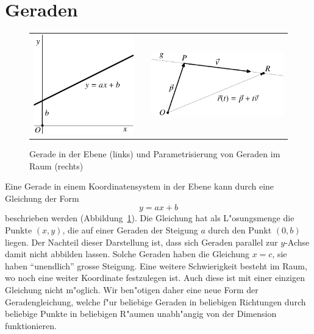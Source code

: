 \section{Geraden}
\begin{figure}
\begin{center}
\begin{tabular}{ccc}
\includegraphics{images/v-6}&%
\qquad\qquad\qquad&
\includegraphics{images/v-7}%
\end{tabular}
\end{center}
\caption{Gerade in der Ebene (links) und Parametrisierung von Geraden im
Raum (rechts) \label{image-gerade}}
\end{figure}
Eine Gerade in einem Koordinatensystem in der Ebene kann durch eine
Gleichung der Form
\[
y=ax+b
\]
beschrieben werden (Abbildung~\ref{image-gerade}).
Die Gleichung hat als L"osungsmenge die Punkte
$(x,y)$, die auf einer Geraden der Steigung $a$ durch den Punkt $(0,b)$
liegen.
Der Nachteil dieser Darstellung ist, dass sich Geraden parallel zur $y$-Achse
damit nicht abbilden lassen.
Solche Geraden haben die Gleichung $x=c$, sie haben
``unendlich'' grosse Steigung.
Eine weitere Schwierigkeit besteht im Raum, wo noch eine weiter Koordinate
festzulegen ist.
Auch diese ist mit einer einzigen Gleichung nicht m"oglich.
Wir ben"otigen daher eine neue Form der Geradengleichung, welche f"ur beliebige
Geraden in beliebigen Richtungen durch beliebige Punkte in beliebigen R"aumen
unabh"angig von der Dimension funktionieren.


